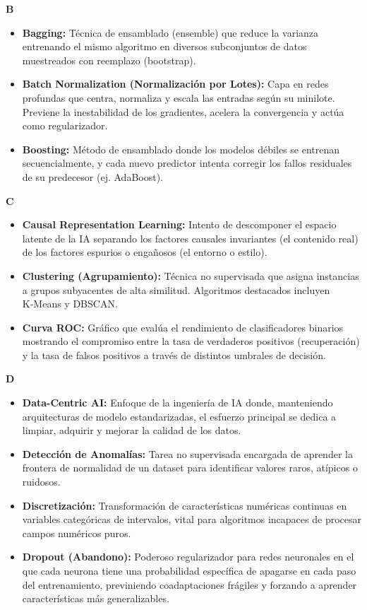 \documentclass[12pt]{book} %
\providecommand{\tightlist}{%
  \setlength{\itemsep}{0pt}\setlength{\parskip}{0pt}}
\begin{document}
\textbf{B}

\begin{itemize}
\tightlist
\item
  \textbf{Bagging:} Técnica de ensamblado (ensemble) que reduce la
  varianza entrenando el mismo algoritmo en diversos subconjuntos de
  datos muestreados con reemplazo (bootstrap).
\item
  \textbf{Batch Normalization (Normalización por Lotes):} Capa en redes
  profundas que centra, normaliza y escala las entradas según su
  minilote. Previene la inestabilidad de los gradientes, acelera la
  convergencia y actúa como regularizador.
\item
  \textbf{Boosting:} Método de ensamblado donde los modelos débiles se
  entrenan secuencialmente, y cada nuevo predictor intenta corregir los
  fallos residuales de su predecesor (ej. AdaBoost).
\end{itemize}

\textbf{C}

\begin{itemize}
\tightlist
\item
  \textbf{Causal Representation Learning:} Intento de descomponer el
  espacio latente de la IA separando los factores causales invariantes
  (el contenido real) de los factores espurios o engañosos (el entorno o
  estilo).
\item
  \textbf{Clustering (Agrupamiento):} Técnica no supervisada que asigna
  instancias a grupos subyacentes de alta similitud. Algoritmos
  destacados incluyen K‑Means y DBSCAN.
\item
  \textbf{Curva ROC:} Gráfico que evalúa el rendimiento de
  clasificadores binarios mostrando el compromiso entre la tasa de
  verdaderos positivos (recuperación) y la tasa de falsos positivos a
  través de distintos umbrales de decisión.
\end{itemize}

\textbf{D}

\begin{itemize}
\tightlist
\item
  \textbf{Data-Centric AI:} Enfoque de la ingeniería de IA donde,
  manteniendo arquitecturas de modelo estandarizadas, el esfuerzo
  principal se dedica a limpiar, adquirir y mejorar la calidad de los
  datos.
\item
  \textbf{Detección de Anomalías:} Tarea no supervisada encargada de
  aprender la frontera de normalidad de un dataset para identificar
  valores raros, atípicos o ruidosos.
\item
  \textbf{Discretización:} Transformación de características numéricas
  continuas en variables categóricas de intervalos, vital para
  algoritmos incapaces de procesar campos numéricos puros.
\item
  \textbf{Dropout (Abandono):} Poderoso regularizador para redes
  neuronales en el que cada neurona tiene una probabilidad específica de
  apagarse en cada paso del entrenamiento, previniendo coadaptaciones
  frágiles y forzando a aprender características más generalizables.
\end{itemize}
\end{document}
